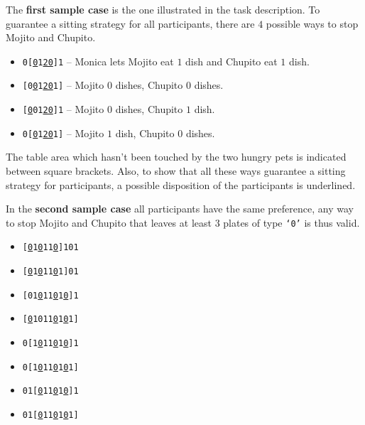 \Examples

\begin{example}
%
%
\end{example}



\Explanation

The \textbf{first sample case} is the one illustrated in the task description.
To guarantee a sitting strategy for all participants, there are $4$ possible
ways to stop Mojito and Chupito.

\begin{itemize}[nolistsep,itemsep=2mm]
	\item \texttt{0[\underline{0}1\underline{2}\underline{0}]1} -- Monica lets Mojito eat $1$ dish and Chupito eat $1$ dish.
	\item \texttt{[0\underline{0}1\underline{2}\underline{0}1]} -- Mojito $0$ dishes, Chupito $0$ dishes.
	\item \texttt{[\underline{0}01\underline{2}\underline{0}]1} -- Mojito $0$ dishes, Chupito $1$ dish.
	\item \texttt{0[\underline{0}1\underline{2}\underline{0}1]} -- Mojito $1$ dish, Chupito $0$ dishes.
\end{itemize}

The table area which hasn't been touched by the two hungry pets is indicated
between square brackets. Also, to show that all these ways guarantee a sitting
strategy for participants, a possible disposition of the participants is underlined.

In the \textbf{second sample case} all participants have the same preference,
any way to stop Mojito and Chupito that leaves at least $3$ plates of type
\texttt{`0'} is thus valid.

\setlength{\columnsep}{-2.1in}
\begin{multicols}{2}
	\begin{itemize}[nolistsep,itemsep=2mm]
		\item \texttt{[\underline{0}1\underline{0}11\underline{0}]101}
		\item \texttt{[\underline{0}1\underline{0}11\underline{0}1]01}
		\item \texttt{[01\underline{0}11\underline{0}1\underline{0}]1}
		\item \texttt{[\underline{0}1011\underline{0}1\underline{0}1]}

		\item \texttt{0[1\underline{0}11\underline{0}1\underline{0}]1}
		\item \texttt{0[1\underline{0}11\underline{0}1\underline{0}1]}
		\item \texttt{01[\underline{0}11\underline{0}1\underline{0}]1}
		\item \texttt{01[\underline{0}11\underline{0}1\underline{0}1]}
	\end{itemize}
\end{multicols}
